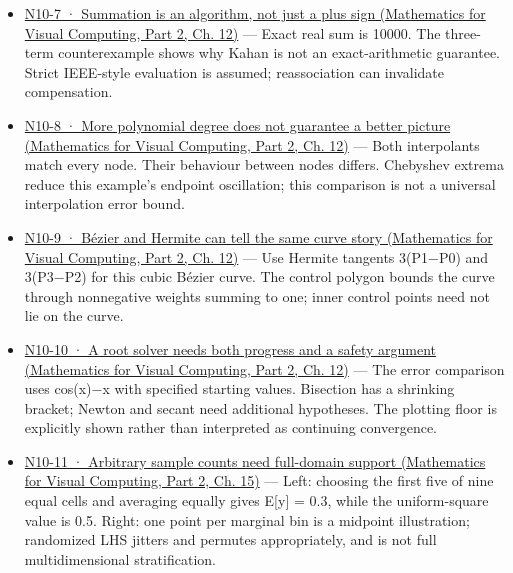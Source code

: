 \begin{itemize}
\item
  \href{../02-Mathematics-for-Visual-Computing-P02/main.pdf\#nameddest=02-foundations-ii-ch028-figure-n10-7-summation-is-an-algorithm-not-just-a-plus-sign}{N10-7 · Summation is an algorithm, not just a plus sign (Mathematics for Visual Computing, Part 2, Ch. 12)} --- Exact real sum is 10000. The three-term counterexample shows why Kahan is not an exact-arithmetic guarantee. Strict IEEE-style evaluation is assumed; reassociation can invalidate compensation.
\item
  \href{../02-Mathematics-for-Visual-Computing-P02/main.pdf\#nameddest=02-foundations-ii-ch028-figure-n10-8-more-polynomial-degree-does-not-guarantee-a-better-picture}{N10-8 · More polynomial degree does not guarantee a better picture (Mathematics for Visual Computing, Part 2, Ch. 12)} --- Both interpolants match every node. Their behaviour between nodes differs. Chebyshev extrema reduce this example's endpoint oscillation; this comparison is not a universal interpolation error bound.
\item
  \href{../02-Mathematics-for-Visual-Computing-P02/main.pdf\#nameddest=02-foundations-ii-ch028-figure-n10-9-bézier-and-hermite-can-tell-the-same-curve-story}{N10-9 · Bézier and Hermite can tell the same curve story (Mathematics for Visual Computing, Part 2, Ch. 12)} --- Use Hermite tangents 3(P1−P0) and 3(P3−P2) for this cubic Bézier curve. The control polygon bounds the curve through nonnegative weights summing to one; inner control points need not lie on the curve.
\item
  \href{../02-Mathematics-for-Visual-Computing-P02/main.pdf\#nameddest=02-foundations-ii-ch028-figure-n10-10-a-root-solver-needs-both-progress-and-a-safety-argument}{N10-10 · A root solver needs both progress and a safety argument (Mathematics for Visual Computing, Part 2, Ch. 12)} --- The error comparison uses cos(x)−x with specified starting values. Bisection has a shrinking bracket; Newton and secant need additional hypotheses. The plotting floor is explicitly shown rather than interpreted as continuing convergence.
\item
  \href{../02-Mathematics-for-Visual-Computing-P02/main.pdf\#nameddest=02-foundations-ii-ch031-figure-n10-11-arbitrary-sample-counts-need-full-domain-support}{N10-11 · Arbitrary sample counts need full-domain support (Mathematics for Visual Computing, Part 2, Ch. 15)} --- Left: choosing the first five of nine equal cells and averaging equally gives E{[}y{]} = 0.3, while the uniform-square value is 0.5. Right: one point per marginal bin is a midpoint illustration; randomized LHS jitters and permutes appropriately, and is not full multidimensional stratification.

\end{itemize}
